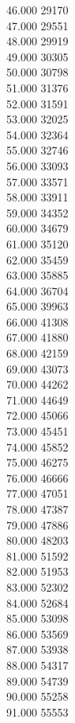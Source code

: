 { 46.000	29170 \\
 47.000	29551 \\
 48.000	29919 \\
 49.000	30305 \\
 50.000	30798 \\
 51.000	31376 \\
 52.000	31591 \\
 53.000	32025 \\
 54.000	32364 \\
 55.000	32746 \\
 56.000	33093 \\
 57.000	33571 \\
 58.000	33911 \\
 59.000	34352 \\
 60.000	34679 \\
 61.000	35120 \\
 62.000	35459 \\
 63.000	35885 \\
 64.000	36704 \\
 65.000	39963 \\
 66.000	41308 \\
 67.000	41880 \\
 68.000	42159 \\
 69.000	43073 \\
 70.000	44262 \\
 71.000	44649 \\
 72.000	45066 \\
 73.000	45451 \\
 74.000	45852 \\
 75.000	46275 \\
 76.000	46666 \\
 77.000	47051 \\
 78.000	47387 \\
 79.000	47886 \\
 80.000	48203 \\
 81.000	51592 \\
 82.000	51953 \\
 83.000	52302 \\
 84.000	52684 \\
 85.000	53098 \\
 86.000	53569 \\
 87.000	53938 \\
 88.000	54317 \\
 89.000	54739 \\
 90.000	55258 \\
 91.000	55553 \\
}
